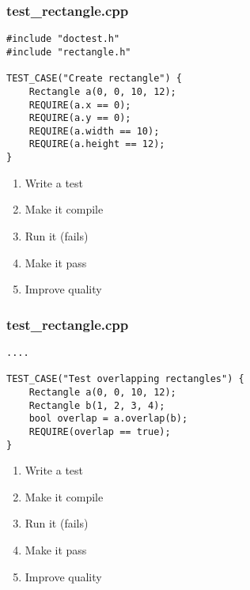 \begin{frame}[fragile]
\frametitle{test\_rectangle.cpp}
\begin{minipage}[t]{0.48\linewidth}
\begin{lstlisting}
#include "doctest.h"
#include "rectangle.h"

TEST_CASE("Create rectangle") {
    Rectangle a(0, 0, 10, 12);
    REQUIRE(a.x == 0);
    REQUIRE(a.y == 0);
    REQUIRE(a.width == 10);
    REQUIRE(a.height == 12);
}
\end{lstlisting}
\end{minipage}\hfill
\begin{minipage}[t]{0.28\linewidth}
  \small
  \begin{enumerate} 
    \item \textcolor{deadcolor}{Write a test}
    \item \textcolor{deadcolor}{Make it compile}
    \item \textcolor{deadcolor}{Run it (fails)}
    \item \textcolor{deadcolor}{Make it pass}
    \item \textcolor{activecolor}{Improve quality}
  \end{enumerate} 
\end{minipage}
\end{frame}


\begin{frame}[fragile]
\frametitle{test\_rectangle.cpp}
\begin{minipage}[t]{0.48\linewidth}
\begin{lstlisting}
....

TEST_CASE("Test overlapping rectangles") {
    Rectangle a(0, 0, 10, 12);
    Rectangle b(1, 2, 3, 4);
    bool overlap = a.overlap(b);
    REQUIRE(overlap == true);
}
\end{lstlisting}
\end{minipage}\hfill
\begin{minipage}[t]{0.28\linewidth}
  \small
  \begin{enumerate} 
    \item \textcolor{activecolor}{Write a test}
    \item \textcolor{deadcolor}{Make it compile}
    \item \textcolor{deadcolor}{Run it (fails)}
    \item \textcolor{deadcolor}{Make it pass}
    \item \textcolor{deadcolor}{Improve quality}
  \end{enumerate} 
\end{minipage}
\end{frame}

